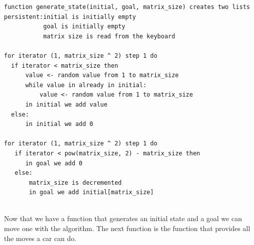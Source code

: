 \documentclass[14pt]{article}
\begin{document}
\begin{verbatim}
function generate_state(initial, goal, matrix_size) creates two lists
persistent:initial is initially empty
           goal is initially empty
           matrix size is read from the keyboard
           
for iterator (1, matrix_size ^ 2) step 1 do
  if iterator < matrix_size then
      value <- random value from 1 to matrix_size
      while value in already in initial: 
          value <- random value from 1 to matrix_size
      in initial we add value
  else:
      in initial we add 0
   
for iterator (1, matrix_size ^ 2) step 1 do
   if iterator < pow(matrix_size, 2) - matrix_size then 
      in goal we add 0
   else:
       matrix_size is decremented
       in goal we add initial[matrix_size] 
\end{verbatim}
\\Now that we have a function that generates an initial state and a goal we can move one with the algorithm. The next function is the function that provides all the moves a car can do.
\end{document}
